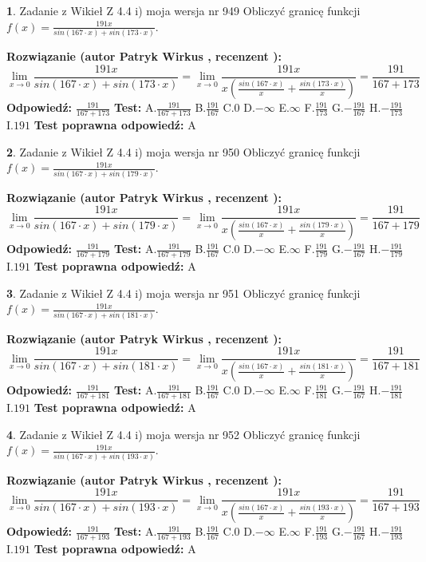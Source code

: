 \documentclass[12pt, a4paper]{article}
\theoremstyle{definition} %
\newtheorem{zad}{}
\newcommand{\zadStart}[1]{\begin{zad}#1\newline}
\newcommand{\zadStop}{\end{zad}}
\newcommand{\rozwStart}[2]{\noindent \textbf{Rozwiązanie (autor #1 , recenzent #2): }\newline}
\newcommand{\rozwStop}{\newline}
\newcommand{\odpStart}{\noindent \textbf{Odpowiedź:}\newline}
\newcommand{\odpStop}{\newline}
\newcommand{\testStart}{\noindent \textbf{Test:}\newline}
\newcommand{\testStop}{\newline}
\newcommand{\kluczStart}{\noindent \textbf{Test poprawna odpowiedź:}\newline}
\newcommand{\kluczStop}{\newline}
\begin{document}
\zadStart{Zadanie z Wikieł Z 4.4 i) moja wersja nr 949}
Obliczyć granicę funkcji $f(x)=\frac{191x}{sin(167\cdot x) +sin(173\cdot x)}$.
\zadStop
\rozwStart{Patryk Wirkus}{}
$$\lim\limits_{x\to 0}\frac{191x}{sin(167\cdot x) +sin(173\cdot x)}=\lim\limits_{x\to 0}\frac{191x}{x(\frac{sin(167\cdot x)}{x}+\frac{sin(173\cdot x)}{x})}=\frac{191}{167+173}$$
\rozwStop
\odpStart
$\frac{191}{167+173}$
\odpStop
\testStart
A.$\frac{191}{167+173}$
B.$\frac{191}{167}$
C.$0$
D.$-\infty$
E.$\infty$
F.$\frac{191}{173}$
G.$-\frac{191}{167}$
H.$-\frac{191}{173}$
I.$191$
\testStop
\kluczStart
A
\kluczStop



\zadStart{Zadanie z Wikieł Z 4.4 i) moja wersja nr 950}
Obliczyć granicę funkcji $f(x)=\frac{191x}{sin(167\cdot x) +sin(179\cdot x)}$.
\zadStop
\rozwStart{Patryk Wirkus}{}
$$\lim\limits_{x\to 0}\frac{191x}{sin(167\cdot x) +sin(179\cdot x)}=\lim\limits_{x\to 0}\frac{191x}{x(\frac{sin(167\cdot x)}{x}+\frac{sin(179\cdot x)}{x})}=\frac{191}{167+179}$$
\rozwStop
\odpStart
$\frac{191}{167+179}$
\odpStop
\testStart
A.$\frac{191}{167+179}$
B.$\frac{191}{167}$
C.$0$
D.$-\infty$
E.$\infty$
F.$\frac{191}{179}$
G.$-\frac{191}{167}$
H.$-\frac{191}{179}$
I.$191$
\testStop
\kluczStart
A
\kluczStop



\zadStart{Zadanie z Wikieł Z 4.4 i) moja wersja nr 951}
Obliczyć granicę funkcji $f(x)=\frac{191x}{sin(167\cdot x) +sin(181\cdot x)}$.
\zadStop
\rozwStart{Patryk Wirkus}{}
$$\lim\limits_{x\to 0}\frac{191x}{sin(167\cdot x) +sin(181\cdot x)}=\lim\limits_{x\to 0}\frac{191x}{x(\frac{sin(167\cdot x)}{x}+\frac{sin(181\cdot x)}{x})}=\frac{191}{167+181}$$
\rozwStop
\odpStart
$\frac{191}{167+181}$
\odpStop
\testStart
A.$\frac{191}{167+181}$
B.$\frac{191}{167}$
C.$0$
D.$-\infty$
E.$\infty$
F.$\frac{191}{181}$
G.$-\frac{191}{167}$
H.$-\frac{191}{181}$
I.$191$
\testStop
\kluczStart
A
\kluczStop



\zadStart{Zadanie z Wikieł Z 4.4 i) moja wersja nr 952}
Obliczyć granicę funkcji $f(x)=\frac{191x}{sin(167\cdot x) +sin(193\cdot x)}$.
\zadStop
\rozwStart{Patryk Wirkus}{}
$$\lim\limits_{x\to 0}\frac{191x}{sin(167\cdot x) +sin(193\cdot x)}=\lim\limits_{x\to 0}\frac{191x}{x(\frac{sin(167\cdot x)}{x}+\frac{sin(193\cdot x)}{x})}=\frac{191}{167+193}$$
\rozwStop
\odpStart
$\frac{191}{167+193}$
\odpStop
\testStart
A.$\frac{191}{167+193}$
B.$\frac{191}{167}$
C.$0$
D.$-\infty$
E.$\infty$
F.$\frac{191}{193}$
G.$-\frac{191}{167}$
H.$-\frac{191}{193}$
I.$191$
\testStop
\kluczStart
A
\kluczStop
\end{document}
